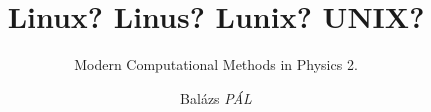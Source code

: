 \title[Linux? Linus? Lunix? UNIX?]{Linux? Linus? Lunix? UNIX?}

\subtitle{Modern Computational Methods in Physics 2.}

\author[Balázs \textit{PÁL}]{Balázs \textit{PÁL}}


\date[ELTE Physics BSc]{}


